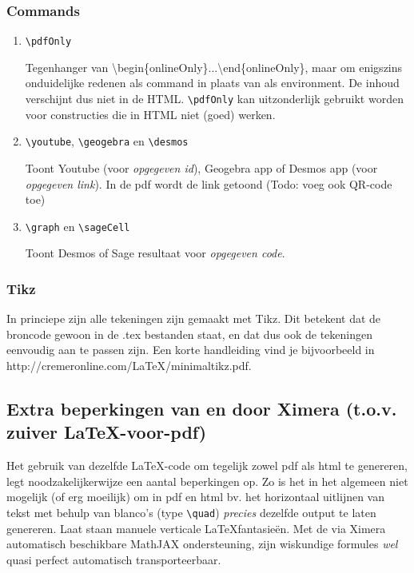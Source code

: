 \documentclass{ximera}
\begin{document}
\subsubsection{Commands}

\begin{enumerate}
    \item \verb|\pdfOnly|

     Tegenhanger van \textbackslash begin\{onlineOnly\}...\textbackslash end\{onlineOnly\}, maar om enigszins onduidelijke redenen als command in plaats van als environment. De inhoud verschijnt dus niet in de HTML. \verb|\pdfOnly| kan uitzonderlijk gebruikt worden voor constructies die in HTML niet (goed) werken.

    \item \verb|\youtube|, \verb|\geogebra|  en \verb|\desmos|
    
    Toont Youtube (voor \textit{opgegeven id}), Geogebra app of Desmos app (voor \textit{opgegeven link}).
    In de pdf wordt de link getoond (Todo: voeg ook QR-code toe)
    
    \item \verb|\graph| en \verb|\sageCell|
    
    Toont Desmos of Sage resultaat voor \textit{opgegeven code}.
    
\end{enumerate}

\subsubsection{Tikz}

In princiepe zijn alle tekeningen zijn gemaakt met Tikz. Dit betekent dat de broncode gewoon in de .tex bestanden staat, en dat dus ook de tekeningen eenvoudig aan te passen zijn. Een korte handleiding vind je bijvoorbeeld in  http://cremeronline.com/LaTeX/minimaltikz.pdf.

\subsection{Extra beperkingen van en door Ximera (t.o.v. zuiver \LaTeX-voor-pdf)}

Het gebruik van dezelfde \LaTeX-code om tegelijk zowel pdf als html te genereren, legt noodzakelijkerwijze een aantal beperkingen op. Zo is het in het algemeen niet mogelijk (of erg moeilijk) om in pdf en html bv. het horizontaal uitlijnen van tekst met behulp van blanco's (type \verb|\quad|) \textit{precies} dezelfde output te laten genereren. Laat staan manuele verticale \LaTeX fantasieën. Met de via Ximera automatisch beschikbare MathJAX ondersteuning, zijn wiskundige formules \textit{wel} quasi perfect automatisch transporteerbaar.
\end{document}

